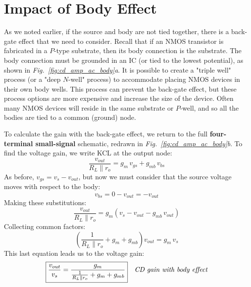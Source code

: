 \section{Impact of Body Effect}
As we noted earlier, if the source and body are not tied together, there is a back-gate effect that we need to consider.  Recall that if an NMOS transistor is fabricated in a $P$-type substrate, then its body connection is the substrate.  The body connection must be grounded in an IC (or tied to the lowest potential), as shown in \emph{Fig.~\ref{fig:cd_amp_ac_body}a}.  It is possible to create a "triple well" process (or a "deep $N$-well" process) to accommodate placing NMOS devices in their own body wells. This process can prevent the back-gate effect, but these process options are more expensive and increase the size of the device.  Often many NMOS devices will reside in the same substrate or $P$-well, and so all the bodies are tied to a common (ground) node.

To calculate the gain with the back-gate effect, we return to the full \textbf{four-terminal small-signal} schematic, redrawn in \emph{Fig.~\ref{fig:cd_amp_ac_body}b}.  To find the voltage gain, we write KCL at the output node: 
    \begin{equation*}
        \frac{v_{out}}{R_L \parallel r_o} = g_m\,v_{gs} + g_{mb}\,v_{bs}
    \end{equation*}
As before, $v_{gs} = v_{s} - v_{out}$, but now we must consider that the source voltage moves with respect to the body:
    \begin{equation*}
        v_{bs} = 0 - v_{out} = -v_{out}
    \end{equation*}
Making these substitutions:
    \begin{equation*}
        \frac{v_{out}}{R_L \parallel r_o} = g_m\left(v_{s} - v_{out} - g_{mb}\,v_{out}\right)
    \end{equation*}
Collecting common factors:
    \begin{equation*}
        \left(\frac{1}{R_L \parallel r_o} + g_m + g_{mb}\right)v_{out} = g_m\,v_{s}
    \end{equation*}
This last equation leads us to the voltage gain:
    \begin{align}
        \Aboxed{\frac{v_{out}}{v_s} &= \frac{g_m}{\frac{1}{R_L \parallel r_o} + g_m + g_{mb}}}
        &\textit{CD gain with body effect}
    \end{align}
\vspace{4cm}
